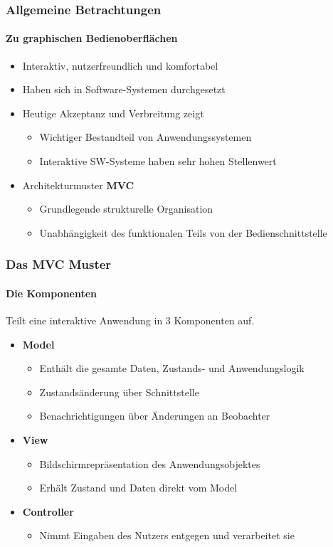 \begin{frame}
	\frametitle{Allgemeine Betrachtungen}
	\framesubtitle{Zu graphischen Bedienoberflächen}
	\begin{itemize}
		\item Interaktiv, nutzerfreundlich und komfortabel
		\item Haben sich in Software-Systemen durchgesetzt
		\item Heutige Akzeptanz und Verbreitung zeigt
		\begin{itemize}
			\item Wichtiger Bestandteil von Anwendungssystemen
			\item Interaktive SW-Systeme haben sehr hohen Stellenwert
		\end{itemize}
		\item Architekturmuster {\bf MVC}
		\begin{itemize}
			\item Grundlegende strukturelle Organisation
			\item Unabhängigkeit des funktionalen Teils von
			der Bedienschnittstelle
		\end{itemize}
	\end{itemize}
\end{frame}

\begin{frame}
	\frametitle{Das MVC Muster}
	\framesubtitle{Die Komponenten}
	\begin{center}
		Teilt eine interaktive Anwendung in 3 Komponenten auf.
	\end{center}
	\begin{itemize}
		\item {\bf Model}
		\begin{itemize}
			\item Enthält die gesamte Daten, Zustands- und Anwendungslogik
			\item Zustandsänderung über Schnittstelle
			\item Benachrichtigungen über Änderungen an Beobachter
		\end{itemize}
		\item {\bf View}
		\begin{itemize}
			\item Bildschirmrepräsentation des Anwendungsobjektes
			\item Erhält Zustand und Daten direkt vom Model
		\end{itemize}
		\item {\bf Controller}
		\begin{itemize}
			\item Nimmt Eingaben des Nutzers entgegen und verarbeitet sie
		\end{itemize}
	\end{itemize}
\end{frame}

